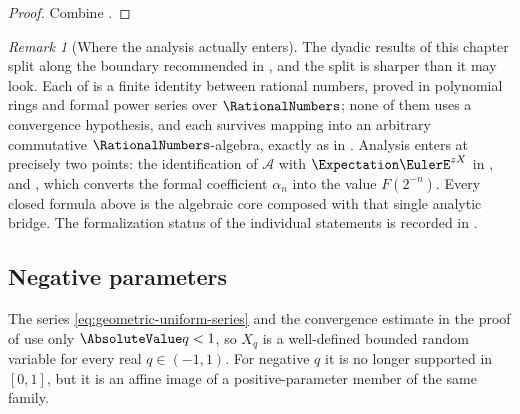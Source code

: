 \documentclass[11pt,a4paper,oneside,openany]{book}
\theoremstyle{definition}
\theoremstyle{remark}
\newtheorem{remark}[remark]{Remark}
\begin{document}
\begin{proof}
Combine .
\end{proof}

\begin{remark}[Where the analysis actually enters]\label{rem:dyadic-algebraic-layer}
The dyadic results of this chapter split along the boundary recommended in
, and the split is sharper than it may look.  Each of
is a finite identity between rational numbers, proved in polynomial rings and formal
power series over $\RationalNumbers$; none of them uses a convergence hypothesis, and each survives
mapping into an arbitrary commutative $\RationalNumbers$-algebra, exactly as in
.  Analysis enters at precisely two points: the
identification of $\mathcal A$ with $\Expectation\EulerE^{zX}$ in
, and , which converts the
formal coefficient $\alpha_n$ into the value $F(2^{-n})$.  Every closed formula above is
the algebraic core composed with that single analytic bridge.  The formalization status
of the individual statements is recorded in .
\end{remark}


\subsection{Negative parameters}

The series \eqref{eq:geometric-uniform-series} and the convergence estimate in
the proof of  use only $\AbsoluteValue q<1$, so $X_q$ is
a well-defined bounded random variable for every real $q\in(-1,1)$.  For negative
$q$ it is no longer supported in $[0,1]$, but it is an affine image of a
positive-parameter member of the same family.
\end{document}
